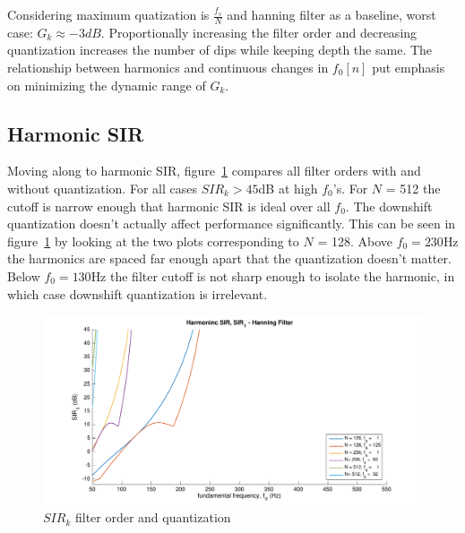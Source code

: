 \documentclass [11pt, proquest,oneside] {ganter_thesis}[2015/03/03]
\begin{document}
Considering maximum quatization is $\frac{f_s}{N}$ and hanning filter as a baseline, worst case: $G_k \approx -3dB$.  Proportionally increasing the filter order and decreasing quantization increases the number of dips while keeping depth the same.  The relationship between harmonics and continuous changes in $f_0[n]$ put emphasis on minimizing the dynamic range of $G_k$.





\clearpage

\subsection{Harmonic SIR}

Moving along to harmonic SIR, figure~\ref{fig:sir_k_1} compares all filter orders with and without quantization.  For all cases $SIR_k > 45$dB at high $f_0$'s.  For $N$ = 512 the cutoff is narrow enough that harmonic SIR is ideal over all $f_0$.  The downshift quantization doesn't actually affect performance significantly.  This can be seen in figure~\ref{fig:sir_k_1} by looking at the two plots corresponding to $N$ = 128.  Above $f_0 = 230$Hz the harmonics are spaced far enough apart that the quantization doesn't matter.  Below $f_0 = 130$Hz the filter cutoff is not sharp enough to isolate the harmonic, in which case downshift quantization is irrelevant.

\begin{figure}[!ht]
  \centering
    \includegraphics[width=1\textwidth]{sir_k_1}   
    \caption{$SIR_k$ filter order and quantization}\label{fig:sir_k_1}
\end{figure}
\end{document}
